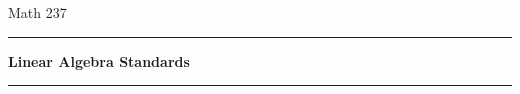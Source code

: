 \documentclass[letterpaper]{article}
\begin{document}
\pagestyle{empty}
\noindent Math 237 \hfill \sem \hfill \prof
\vspace{0.3in}
\hrule
\begin{center}{\large \bf Linear Algebra Standards}\end{center}
\hrule

\begin{multicols}{2}

\end{multicols}
\end{document}
